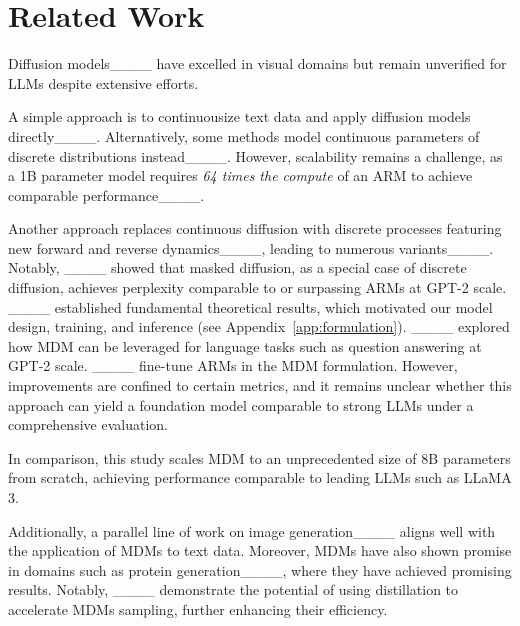 \section{Related Work}
Diffusion models____ have excelled in visual domains but remain unverified for LLMs despite extensive efforts.

A simple approach is to continuousize text data and apply diffusion models directly____. Alternatively, some methods model continuous parameters of discrete distributions instead____. However, scalability remains a challenge, as a 1B parameter model requires \emph{64 times the compute} of an ARM to achieve comparable performance____.



Another approach replaces continuous diffusion with discrete processes featuring new forward and reverse dynamics____, leading to numerous variants____. Notably, ____ showed that masked diffusion, as a special case of discrete diffusion, achieves perplexity comparable to or surpassing ARMs at GPT-2 scale. ____ established fundamental theoretical results, which motivated our model design, training, and inference (see Appendix~\ref{app:formulation}).  ____ explored how MDM can be leveraged for language tasks such as question answering at GPT-2 scale. ____ fine-tune ARMs in the MDM formulation. However, improvements are confined to certain metrics, and it remains unclear whether this approach can yield a foundation model comparable to strong LLMs under a comprehensive evaluation.



In comparison, this study scales MDM to an unprecedented size of 8B parameters from scratch, achieving performance comparable to leading LLMs such as LLaMA 3.

Additionally, a parallel line of work on image generation____ aligns well with the application of MDMs to text data. Moreover, MDMs have also shown promise in domains such as protein generation____, where they have achieved promising results. Notably, ____ demonstrate the potential of using distillation to accelerate MDMs sampling, further enhancing their efficiency.